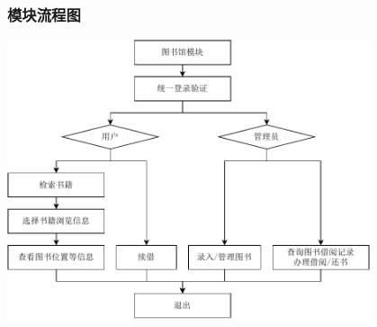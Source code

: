 \documentclass{article}
\begin{document}
\subsubsection{模块流程图}
\begin{center}
    \includegraphics[width=0.8\textwidth]{fig/library-flowchart.pdf}
\end{center}

\end{document}
